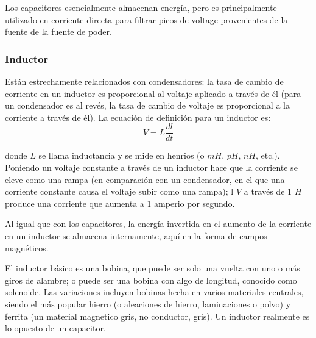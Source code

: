 		\par \noindent
			Los capacitores esencialmente almacenan energía, pero es principalmente utilizado en corriente directa para filtrar picos de voltage provenientes de la fuente de la fuente de poder.
		
		\newpage
		\thispagestyle{plain}
		
	\subsubsection{Inductor} 
		\par
			Están estrechamente relacionados con condensadores: la tasa de cambio de corriente en un inductor
			es proporcional al voltaje aplicado a través de él (para un condensador es al revés, la tasa de cambio de voltaje es proporcional a la corriente a través de él). La ecuación de definición para un inductor es:
			$$V = L\frac{dl}{dt}$$
		
		\par \noindent
			donde $L$ se llama inductancia y se mide en henrios
			(o $mH$, $pH$, $nH$, etc.). Poniendo un voltaje constante a través de un
			inductor hace que la corriente se eleve como una rampa (en comparación con un condensador, en el que una corriente constante causa el voltaje subir como una rampa); l $V$ a través de 1 $H$ produce una corriente que aumenta a 1 amperio por segundo.
	
		\par \noindent
			Al igual que con los capacitores, la energía invertida en el aumento de la corriente en un inductor se almacena internamente, aquí en la forma de campos magnéticos.
			
		\par \noindent
			El inductor básico es una bobina, que puede ser solo una vuelta con uno o más giros de alambre; o puede ser una bobina con algo de longitud, conocido como solenoide. Las variaciones incluyen bobinas hecha en varios materiales centrales, siendo el más popular hierro (o aleaciones de hierro, laminaciones o polvo) y ferrita (un material magnetico gris, no conductor, gris). Un inductor realmente es lo opuesto de un capacitor.